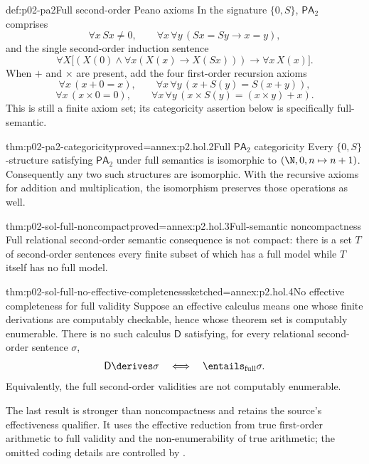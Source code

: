 \begin{hbdefinition}{def:p02-pa2}{Full second-order Peano axioms}
In the signature \(\{0,S\}\), \(\mathsf{PA}_2\) comprises
\[
 \forall x\,Sx\ne0,
 \qquad
 \forall x\,\forall y\,(Sx=Sy\to x=y),
\]
and the single second-order induction sentence
\[
 \forall X\bigl[(X(0)\land
   \forall x(X(x)\to X(Sx)))\to\forall x\,X(x)\bigr].
\]
When \(+\) and \(\times\) are present, add the four first-order recursion
axioms
\[
 \forall x\,(x+0=x),\qquad
 \forall x\,\forall y\,(x+S(y)=S(x+y)),
\]
\[
 \forall x\,(x\times0=0),\qquad
 \forall x\,\forall y\,(x\times S(y)=(x\times y)+x).
\]
This is still a finite axiom set; its categoricity assertion below is
specifically full-semantic.
\end{hbdefinition}

\begin{hbtheorem}{thm:p02-pa2-categoricity}{proved=annex:p2.hol.2}{Full \(\mathsf{PA}_2\) categoricity}
Every \(\{0,S\}\)-structure satisfying \(\mathsf{PA}_2\) under full
semantics is isomorphic to \((\N,0,n\mapsto n+1)\).  Consequently any two
such structures are isomorphic.  With the recursive axioms for addition and
multiplication, the isomorphism preserves those operations as well.
\end{hbtheorem}

\begin{hbtheorem}{thm:p02-sol-full-noncompact}{proved=annex:p2.hol.3}{Full-semantic noncompactness}
Full relational second-order semantic consequence is not compact: there is
a set \(T\) of second-order sentences every finite subset of which has a full
model while \(T\) itself has no full model.
\end{hbtheorem}

\begin{hbtheorem}{thm:p02-sol-full-no-effective-completeness}{sketched=annex:p2.hol.4}{No effective completeness for full validity}
Suppose an effective calculus means one whose finite derivations are
computably checkable, hence whose theorem set is computably enumerable.
There is no such calculus \(\mathsf D\) satisfying, for every relational
second-order sentence \(\sigma\),
\[
 \mathsf D\derives\sigma
 \quad\Longleftrightarrow\quad
 \entails_{\mathrm{full}}\sigma.
\]
Equivalently, the full second-order validities are not computably enumerable.
\end{hbtheorem}

The last result is stronger than noncompactness and retains the source's
effectiveness qualifier.  It uses the effective reduction from true
first-order arithmetic to full validity and the non-enumerability of true
arithmetic; the omitted coding details are controlled by
\cite{BarwiseFeferman1985,Shapiro1991}.

